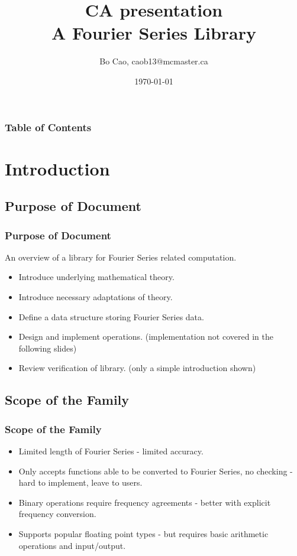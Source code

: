 \documentclass{beamer}
\title{CA presentation\\A Fourier Series Library}
\author{Bo Cao, caob13@mcmaster.ca}
\date{\today}
\begin{document}
	\begin{frame}
		\maketitle
	\end{frame}
\begin{frame}[allowframebreaks]
\frametitle{Table of Contents}
\tableofcontents[sections={1-3}]
\framebreak
\tableofcontents[sections={4-7}]
\end{frame}

	\section{Introduction}
	\subsection{Purpose of Document}
	\begin{frame}
		\frametitle{Purpose of Document}
		An overview of a library for Fourier Series related computation.
		\begin{itemize}
			\item Introduce underlying mathematical theory.
			\item Introduce necessary adaptations of theory.
			\item Define a data structure storing Fourier Series data.
			\item Design and implement operations. (implementation not covered in the following slides)
			\item Review verification of library. (only a simple introduction shown)
		\end{itemize}
	\end{frame}

	\subsection{Scope of the Family}
	\begin{frame}
		\frametitle{Scope of the Family}
		\begin{itemize}
			\item Limited length of Fourier Series - limited accuracy.
			\item Only accepts functions able to be converted to Fourier Series, no checking - hard to implement, leave to users.
			\item Binary operations require frequency agreements - better with explicit frequency conversion.
			\item Supports popular floating point types - but requires basic arithmetic operations and input/output.  
		\end{itemize}
	\end{frame}
\end{document}
